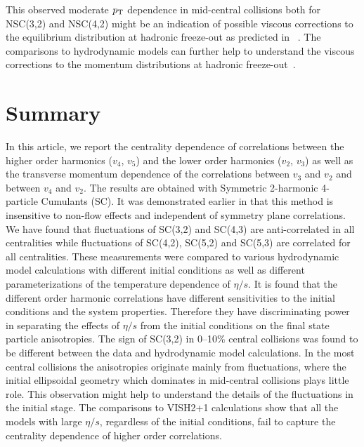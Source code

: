 This observed moderate $p_{\rm T}$ dependence in mid-central collisions both for NSC(3,2) and NSC(4,2) might be an indication of possible viscous corrections to the equilibrium distribution at hadronic freeze-out as predicted in ~\cite{Niemi:2012aj}.
The comparisons to hydrodynamic models can further help to understand the viscous corrections to the momentum distributions at hadronic freeze-out~\cite{Dusling:2009df,Luzum:2010ad,Teaney:2012ke,Molnar:2014fva,Niemi:2015qia}.


 
\section{Summary}
\label{sec:summary}
In this article, we report the centrality dependence of correlations between the higher order harmonics ($v_4$, $v_5$) and the lower order harmonics ($v_2$, $v_3$) as well as the transverse momentum dependence of the correlations between $v_3$ and $v_2$ and between $v_4$ and $v_2$.
The results are obtained with Symmetric 2-harmonic 4-particle Cumulants (SC). It was demonstrated earlier in \cite{ALICE:2016kpq} that this method is insensitive to non-flow effects and independent of symmetry plane correlations.
We have found that fluctuations of SC(3,2) and SC(4,3) are anti-correlated in all centralities while fluctuations of SC(4,2), SC(5,2) and SC(5,3) are correlated for all centralities. 
These measurements were compared to various hydrodynamic model calculations with different initial conditions as well as different parameterizations of the temperature dependence of $\eta/s$.
It is found that the different order harmonic correlations have different sensitivities to the initial conditions and the system properties. Therefore they have discriminating power in separating the effects of $\eta/s$  from the initial conditions on the final state particle anisotropies.
The sign of SC(3,2) in 0--10\% central collisions was found to be different between the data and hydrodynamic model calculations.
In the most central collisions the anisotropies originate mainly from fluctuations, where the initial ellipsoidal geometry which dominates in mid-central collisions plays little role. This observation might help to understand the details of the fluctuations in the initial stage. 
The comparisons to VISH2+1 calculations show that all the models with large $\eta/s$, regardless of the initial conditions, fail to capture the centrality dependence of higher order correlations. 

